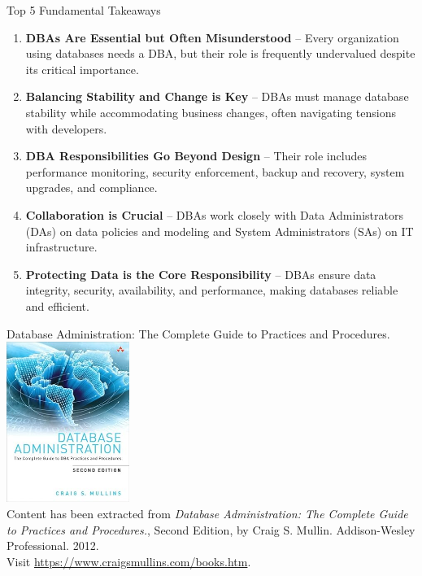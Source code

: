 \documentclass{beamer}
\begin{document}
\begin{frame}{Top 5 Fundamental Takeaways}
    \begin{enumerate} \pause
        \item[5] \textbf{DBAs Are Essential but Often Misunderstood} – Every organization using databases needs a DBA, but their role is frequently undervalued despite its critical importance.\pause
        \item[4] \textbf{Balancing Stability and Change is Key} – DBAs must manage database stability while accommodating business changes, often navigating tensions with developers.\pause
        \item[3] \textbf{DBA Responsibilities Go Beyond Design} – Their role includes performance monitoring, security enforcement, backup and recovery, system upgrades, and compliance.\pause
        \item[2] \textbf{Collaboration is Crucial} – DBAs work closely with Data Administrators (DAs) on data policies and modeling and System Administrators (SAs) on IT infrastructure.\pause
        \item[1] \textbf{Protecting Data is the Core Responsibility} – DBAs ensure data integrity, security, availability, and performance, making databases reliable and efficient.
    \end{enumerate}
\end{frame}

\begin{frame}{Database Administration: The Complete Guide to Practices and Procedures.}
    \centering
    \includegraphics[width=0.3\textwidth]{figures/book_cover.jpg} \\
    \vspace{5mm}
    {
        \tiny
        Content has been extracted from \textit{Database Administration: The Complete Guide to Practices and Procedures.}, Second Edition, by Craig S. Mullin. Addison-Wesley Professional. 2012.\\
        Visit \url{https://www.craigsmullins.com/books.htm}.\\
    }
\end{frame}
\end{document}
